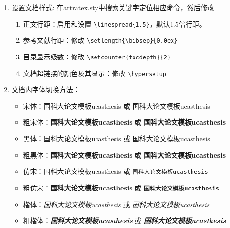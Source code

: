 \begin{enumerate}
        \verb+\chapter{item name}+  and \verb+\section*{item name}+

        来显式实现的 (请观察Backmatter.tex)，从而可以随意添加，放置，和修改，如同一般章节。对于图表目录名称则可在ucasthesis.cfg中进行修改。

    \item 设置文档样式: 在artratex.sty中搜索关键字定位相应命令，然后修改
        \begin{enumerate}
            \item 正文行距：启用和设置 \verb|\linespread{1.5}|，默认1.5倍行距。
            \item 参考文献行距：修改 \verb|\setlength{\bibsep}{0.0ex}|
            \item 目录显示级数：修改 \verb|\setcounter{tocdepth}{2}|
            \item 文档超链接的颜色及其显示：修改 \verb|\hypersetup|
        \end{enumerate}

    \item 文档内字体切换方法：
        \begin{itemize}
            \item 宋体：国科大论文模板ucasthesis 或 \textrm{国科大论文模板ucasthesis}
            \item 粗宋体：{\bfseries 国科大论文模板ucasthesis} 或 \textbf{国科大论文模板ucasthesis}
            \item 黑体：{\sffamily 国科大论文模板ucasthesis} 或 \textsf{国科大论文模板ucasthesis}
            \item 粗黑体：{\bfseries\sffamily 国科大论文模板ucasthesis} 或 \textsf{\bfseries 国科大论文模板ucasthesis}
            \item 仿宋：{\ttfamily 国科大论文模板ucasthesis} 或 \texttt{国科大论文模板ucasthesis}
            \item 粗仿宋：{\bfseries\ttfamily 国科大论文模板ucasthesis} 或 \texttt{\bfseries 国科大论文模板ucasthesis}
            \item 楷体：{\itshape 国科大论文模板ucasthesis} 或 \textit{国科大论文模板ucasthesis}
            \item 粗楷体：{\bfseries\itshape 国科大论文模板ucasthesis} 或 \textit{\bfseries 国科大论文模板ucasthesis}
        \end{itemize}
\end{enumerate}


